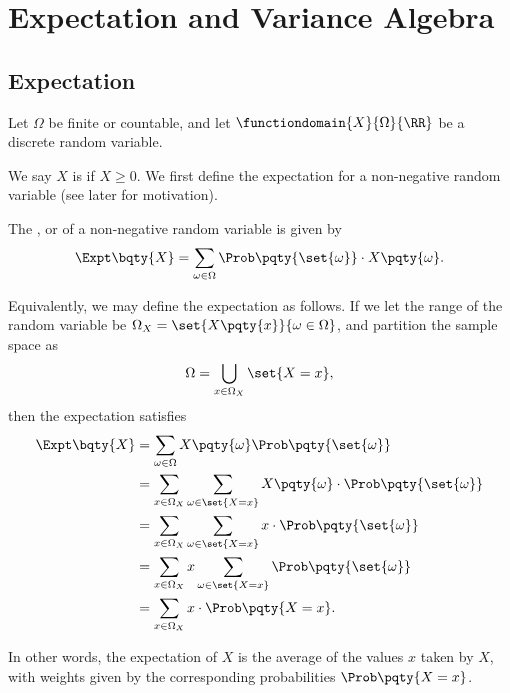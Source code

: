 \section{Expectation and Variance Algebra}

\subsection{Expectation}

Let \(\Omega\) be finite or countable, and let \(\functiondomain{X}{\Omega}{\RR}\) be a discrete random variable.

We say \(X\) is  if \(X \geq 0\). We first define the expectation for a non-negative random variable (see later for motivation).

\begin{definition}
    \label{def:expectation-non-negative}%
    The , or  of a non-negative random variable is given by
    \[
        \Expt \bqty{X} = \sum_{\omega \in \Omega} \Prob\pqty{\set{\omega}} \cdot X\pqty{\omega}.
    \]
\end{definition}

Equivalently, we may define the expectation as follows. If we let the range of the random variable be \(\Omega_X = \set{X\pqty{x}}{\omega \in \Omega}\), and partition the sample space as
\[
    \Omega = \bigcup_{x \in \Omega_X} \set{X = x},
\]
then the expectation satisfies
\begin{align*}
    \Expt\bqty{X} &= \sum_{\omega \in \Omega} X\pqty{\omega} \Prob\pqty{\set{\omega}} \\
    &= \sum_{x \in \Omega_X} \sum_{\omega \in \set{X = x}} X\pqty{\omega} \cdot \Prob\pqty{\set{\omega}} \\
    &= \sum_{x \in \Omega_X} \sum_{\omega \in \set{X = x}} x \cdot \Prob\pqty{\set{\omega}} \\
    &= \sum_{x \in \Omega_X} x \sum_{\omega \in \set{X = x}} \Prob\pqty{\set{\omega}} \\
    &= \sum_{x \in \Omega_X} x \cdot \Prob\pqty{X = x}.
\end{align*}

In other words, the expectation of \(X\) is the average of the values \(x\) taken by \(X\), with weights given by the corresponding probabilities \(\Prob\pqty{X = x}\).

